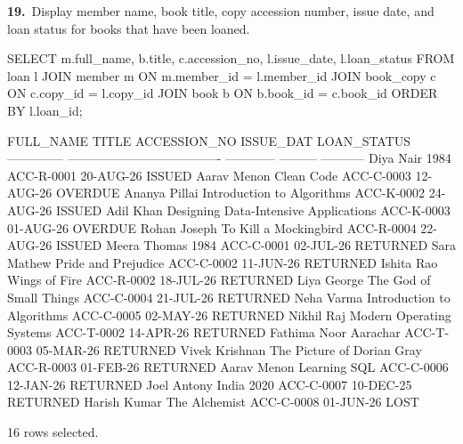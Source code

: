 \noindent\begin{minipage}{\linewidth}
\begingroup{}
{\fontsize{14}{17}\selectfont\textbf{19.}}\ Display member name, book title, copy accession number, issue date, and loan status for books that have been loaned.\par
\endgroup\vspace{12pt}


\begin{sqlcode}
SELECT m.full_name, b.title, c.accession_no, l.issue_date, l.loan_status
FROM loan l
JOIN member m ON m.member_id = l.member_id
JOIN book_copy c ON c.copy_id = l.copy_id
JOIN book b ON b.book_id = c.book_id
ORDER BY l.loan_id;
\end{sqlcode}

\vspace{18pt}


\begin{sqlout}[fontsize=\footnotesize]
FULL_NAME       TITLE                                  ACCESSION_NO  ISSUE_DAT  LOAN_STATUS
--------------  -------------------------------------  ------------  ---------  -----------
Diya Nair       1984                                   ACC-R-0001    20-AUG-26  ISSUED
Aarav Menon     Clean Code                             ACC-C-0003    12-AUG-26  OVERDUE
Ananya Pillai   Introduction to Algorithms             ACC-K-0002    24-AUG-26  ISSUED
Adil Khan       Designing Data-Intensive Applications  ACC-K-0003    01-AUG-26  OVERDUE
Rohan Joseph    To Kill a Mockingbird                  ACC-R-0004    22-AUG-26  ISSUED
Meera Thomas    1984                                   ACC-C-0001    02-JUL-26  RETURNED
Sara Mathew     Pride and Prejudice                    ACC-C-0002    11-JUN-26  RETURNED
Ishita Rao      Wings of Fire                          ACC-R-0002    18-JUL-26  RETURNED
Liya George     The God of Small Things                ACC-C-0004    21-JUL-26  RETURNED
Neha Varma      Introduction to Algorithms             ACC-C-0005    02-MAY-26  RETURNED
Nikhil Raj      Modern Operating Systems               ACC-T-0002    14-APR-26  RETURNED
Fathima Noor    Aarachar                               ACC-T-0003    05-MAR-26  RETURNED
Vivek Krishnan  The Picture of Dorian Gray             ACC-R-0003    01-FEB-26  RETURNED
Aarav Menon     Learning SQL                           ACC-C-0006    12-JAN-26  RETURNED
Joel Antony     India 2020                             ACC-C-0007    10-DEC-25  RETURNED
Harish Kumar    The Alchemist                          ACC-C-0008    01-JUN-26  LOST

16 rows selected.
\end{sqlout}
\end{minipage}\par\vspace{24pt}


